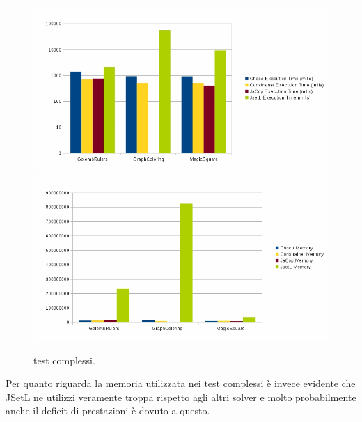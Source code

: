 \begin{figure}[!ht]
\centering
\includegraphics[scale=.45]{img/grafico13.jpg}
\includegraphics[scale=.4]{img/grafico14.jpg}
\caption{test complessi.}
\end{figure}

Per quanto riguarda la memoria utilizzata nei test complessi è invece evidente
che JSetL ne utilizzi veramente troppa rispetto agli altri solver e molto
probabilmente anche il deficit di prestazioni è dovuto a questo.

